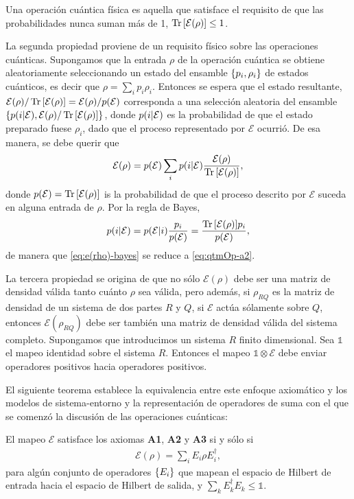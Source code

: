 \documentclass[11pt,dvipsnames]{report}
\newcommand{\E}{\mathcal{E}}
\begin{document}
Una operación cuántica física es aquella que satisface el 
requisito de que las probabilidades nunca suman más de 1,
$\Tr \qty[\E (\rho)]\leq 1$.

La segunda propiedad proviene de un requisito físico sobre las
operaciones cuánticas. Supongamos que la entrada $\rho$ de la 
operación cuántica se obtiene aleatoriamente seleccionando un 
estado del ensamble $\qty{ p_i,\rho_i}$ de estados cuánticos, 
es decir que $\rho = \sum_i p_i\rho_i$. Entonces se espera que
el estado resultante, $\E (\rho)/\Tr \qty[\E (\rho)] =
\E (\rho)/p\qty(\E)$ corresponda a una selección aleatoria del
ensamble $\qty{p\qty(i\vert\E), \E (\rho)/\Tr \qty[\E (\rho)]}$,
donde $p\qty(i\vert\E)$ es la probabilidad de que el estado
preparado fuese $\rho_i$, dado que el proceso representado por
$\E$ ocurrió. De esa manera, se debe querir que
\begin{align}
	\E (\rho) = p\qty(\E)\sum _i p\qty(i\vert \E)\frac{\E (\rho)}
	{\Tr \qty[\E (\rho)]},
	\label{eq:e(rho)-bayes}
\end{align}
donde $p\qty(\E)=\Tr \qty[\E (\rho)]$ is la probabilidad de que 
el proceso descrito por $\E$ suceda en alguna entrada de $\rho$.
Por la regla de Bayes,
\begin{align}
	p\qty(i\vert \E)=p\qty(\E \vert i) \frac{p_i}{p\qty(\E)}
	=\frac{\Tr \qty[\E (\rho)]p_i}{p\qty(\E)},
\end{align}
de manera que \eqref{eq:e(rho)-bayes} se reduce a \eqref{eq:qtmOp-a2}.

La tercera propiedad se origina de que no sólo $\E (\rho)$ debe ser
una matriz de densidad válida tanto cuánto $\rho$ sea válida, pero 
además, si $\rho _{RQ}$ es la matriz de densidad de un sistema 
de dos partes $R$ y $Q$, si $\E$ actúa sólamente sobre $Q$, 
entonces $\E(\rho_{RQ})$ debe ser también una matriz de densidad 
válida del sistema completo. Supongamos que introducimos un sistema 
$R$ finito dimensional. Sea $\mathbb{1}$ el mapeo identidad sobre
el sistema $R$. Entonces el mapeo $\mathbb{1}\otimes \E$ debe
enviar operadores positivos hacia operadores positivos.

El siguiente teorema establece la equivalencia entre este enfoque 
axiomático y los modelos de sistema-entorno y la representación
de operadores de suma con el que se comenzó
la discusión de las operaciones cuánticas:
\begin{teorema}
	El mapeo $\E$ satisface los axiomas \textbf{A1}, \textbf{A2} y 
	\textbf{A3} si y sólo si
	\begin{align}
		\E(\rho) = \sum _i E_i\rho E_i^{\dagger},
	\end{align}
	para algún conjunto de operadores $\qty{E_i}$ que mapean el espacio
	de Hilbert de entrada hacia el espacio de Hilbert de salida, y
	$\sum _kE_k^{\dagger}E_k\leq \mathbb{1}$.
\end{teorema}
\end{document}
